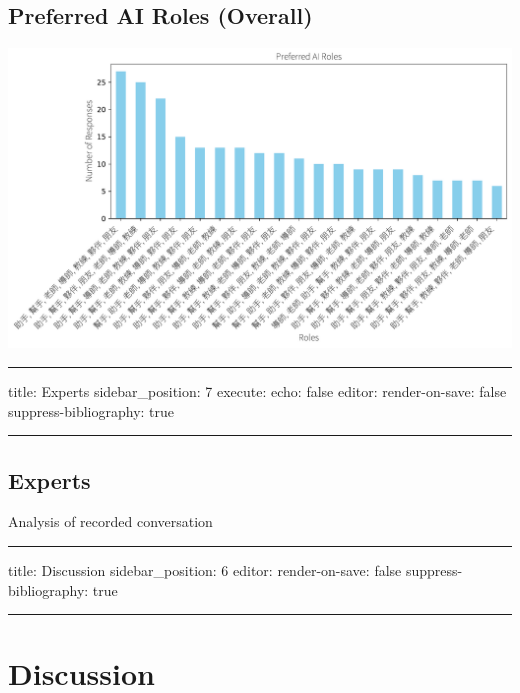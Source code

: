 \documentclass[
  letterpaper,
  DIV=11,
  numbers=noendperiod]{scrartcl}
\begin{document}
\subsection{Preferred AI Roles
(Overall)}\label{preferred-ai-roles-overall}

\includegraphics{_thesis_files/figure-pdf/cell-35-output-1.pdf}

\begin{center}\rule{0.5\linewidth}{0.5pt}\end{center}

title: Experts sidebar\_position: 7 execute: echo: false editor:
render-on-save: false suppress-bibliography: true

\begin{center}\rule{0.5\linewidth}{0.5pt}\end{center}

\subsection{Experts}\label{experts}

Analysis of recorded conversation

\newpage

\begin{center}\rule{0.5\linewidth}{0.5pt}\end{center}

title: Discussion sidebar\_position: 6 editor: render-on-save: false
suppress-bibliography: true

\begin{center}\rule{0.5\linewidth}{0.5pt}\end{center}

\section{Discussion}\label{discussion}
\end{document}
